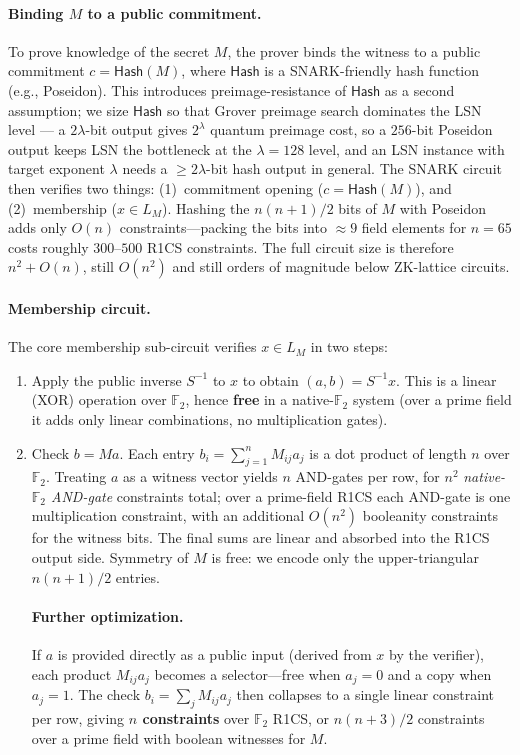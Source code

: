 \documentclass[11pt,a4paper]{article}
\theoremstyle{plain}
\theoremstyle{definition}
\newcommand{\F}{\mathbb{F}}
\begin{document}
\paragraph{Binding $M$ to a public commitment.}
To prove knowledge of the secret $M$, the prover binds the witness to a public commitment $c = \mathsf{Hash}(M)$, where $\mathsf{Hash}$ is a SNARK-friendly hash function (e.g., Poseidon). This introduces preimage-resistance of $\mathsf{Hash}$ as a second assumption; we size $\mathsf{Hash}$ so that Grover preimage search dominates the LSN level --- a $2\lambda$-bit output gives $2^{\lambda}$ quantum preimage cost, so a $256$-bit Poseidon output keeps LSN the bottleneck at the $\lambda=128$ level, and an LSN instance with target exponent $\lambda$ needs a $\geq 2\lambda$-bit hash output in general. The SNARK circuit then verifies two things: (1)~commitment opening ($c = \mathsf{Hash}(M)$), and (2)~membership ($x \in L_M$). Hashing the $n(n+1)/2$ bits of $M$ with Poseidon adds only $O(n)$ constraints---packing the bits into $\approx 9$ field elements for $n=65$ costs roughly $300$--$500$ R1CS constraints. The full circuit size is therefore $n^2 + O(n)$, still $O(n^2)$ and still orders of magnitude below ZK-lattice circuits.

\paragraph{Membership circuit.}
The core membership sub-circuit verifies $x \in L_M$ in two steps:
\begin{enumerate}
\item Apply the public inverse $S^{-1}$ to $x$ to obtain $(a,b) = S^{-1}x$. This is a linear (XOR) operation over $\F_2$, hence \textbf{free} in a native-$\F_2$ system (over a prime field it adds only linear combinations, no multiplication gates).
\item Check $b = Ma$. Each entry $b_i = \sum_{j=1}^n M_{ij} a_j$ is a dot product of length $n$ over $\F_2$. Treating $a$ as a witness vector yields $n$ AND-gates per row, for $n^2$ \emph{native-$\F_2$ AND-gate} constraints total; over a prime-field R1CS each AND-gate is one multiplication constraint, with an additional $O(n^2)$ booleanity constraints for the witness bits. The final sums are linear and absorbed into the R1CS output side. Symmetry of $M$ is free: we encode only the upper-triangular $n(n+1)/2$ entries.

\paragraph{Further optimization.} If $a$ is provided directly as a public input (derived from $x$ by the verifier), each product $M_{ij}a_j$ becomes a selector---free when $a_j=0$ and a copy when $a_j=1$. The check $b_i = \sum_j M_{ij}a_j$ then collapses to a single linear constraint per row, giving \textbf{$n$ constraints} over $\F_2$ R1CS, or $n(n+3)/2$ constraints over a prime field with boolean witnesses for $M$.
\end{enumerate}
\end{document}
